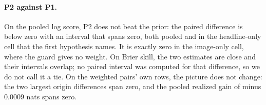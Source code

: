 \begin{table}[t]\centering\scriptsize
\caption{Paired log-score differences in nats on the headline archive between the precedent rung (P2), the fitted prior (P1) and P2 with its guard removed. A weighted pair, headed admitted pair in the table, is a pair of origin and cell in which the guard gives precedents a weight. Rows: the differences, pooled and at single origins. Columns: over all the rows a line covers, 10,697 when pooled, and over the rows of the four weighted pairs, 2,703 when pooled, or over the rows of that origin's weighted pair on an origin line. All four weighted pairs sit in the headline-only cell, and the guard gives no weight in the image-only cell. The two origins named are the ones with the largest differences; no interval was computed for an origin's difference over all rows. A positive difference favours the first named.}
\label{tab:fmt-p2-vs-p1}
\resizebox{\columnwidth}{!}{%
}
\end{table}

\paragraph{P2 against P1.}
On the pooled log score, P2 does not beat the prior: the paired difference is below zero with an interval that spans zero, both pooled and in the headline-only cell that the first hypothesis names. It is exactly zero in the image-only cell, where the guard gives no weight. On Brier skill, the two estimates are close and their intervals overlap; no paired interval was computed for that difference, so we do not call it a tie.
On the weighted pairs' own rows, the picture does not change: the two largest origin differences span zero, and the pooled realized gain of minus 0.0009 nats spans zero.

